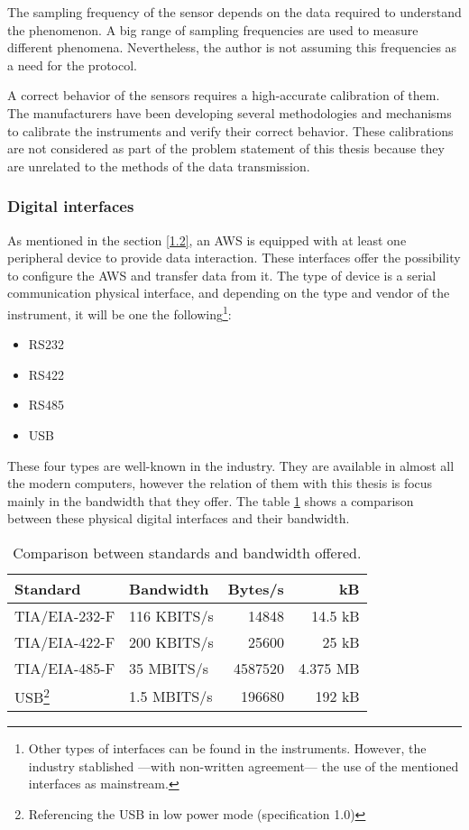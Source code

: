 {The sampling frequency of the sensor depends on the data required to understand the phenomenon. A big range of sampling frequencies are used to measure different phenomena. Nevertheless, the author is not assuming this frequencies as a need for the protocol. 

A correct behavior of the sensors requires a high-accurate calibration of them. The manufacturers have been developing several methodologies and mechanisms to calibrate the instruments and verify their correct behavior. These calibrations are not considered as part of the problem statement of this thesis because they are unrelated to the methods of the data transmission.

\subsubsection{Digital interfaces}

As mentioned in the section \ref{1.2}, an \gls{AWS} is equipped with at least one peripheral device to provide data interaction. These interfaces offer the possibility to configure the \gls{AWS} and transfer data from it. The type of device is a serial communication physical interface, and depending on the type and vendor of the instrument, it will be one the following\footnote{Other types of interfaces can be found in the instruments. However, the industry stablished —with non-written agreement— the use of the mentioned interfaces as mainstream.}:

\begin{itemize}
\item \gls{RS232}
\item \gls{RS422}
\item \gls{RS485}
\item \gls{USB}
\end{itemize}

These four types are well-known in the industry. They are available in almost all the modern computers, however the relation of them with this thesis is focus mainly in the bandwidth that they offer. 
The table \ref{Table3.1} shows a comparison between these physical digital interfaces and their bandwidth.
\begin{table}[h]
\centering
    \begin{tabular}{| l | l | r | r |}
    \hline
    \textbf{Standard} & \textbf{Bandwidth} & \textbf{Bytes/s}  & \textbf{kB} \\ \hline
    TIA/EIA-232-F\cite{RS232S} & 116 \gls{KBITS}/s & 14848 & 14.5 \gls{kB}\\ \hline
    TIA/EIA-422-F\cite{RS422S} & 200 \gls{KBITS}/s & 25600 & 25 \gls{kB}\\ \hline
    TIA/EIA-485-F\cite{RS485S} & 35  \gls{MBITS}/s & 4587520 & 4.375 \gls{MB}\\ \hline
    USB\cite{USBS}\protect \footnote{Referencing the USB in low power mode (specification 1.0)} & 1.5  \gls{MBITS}/s & 196680 & 192 \gls{kB}\\ \hline
\end{tabular}
  \caption{Comparison between standards and bandwidth offered.}
  \label{Table3.1}
\end{table}

}
